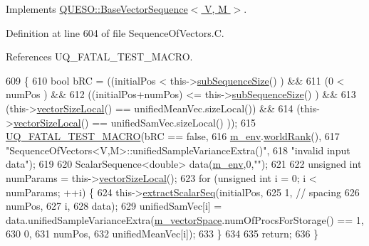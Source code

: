 Implements \hyperlink{class_q_u_e_s_o_1_1_base_vector_sequence_abc759076a4c5d9e1586a6d93629778ff}{Q\-U\-E\-S\-O\-::\-Base\-Vector\-Sequence$<$ V, M $>$}.



Definition at line 604 of file Sequence\-Of\-Vectors.\-C.



References U\-Q\-\_\-\-F\-A\-T\-A\-L\-\_\-\-T\-E\-S\-T\-\_\-\-M\-A\-C\-R\-O.


\begin{DoxyCode}
609 \{
610   \textcolor{keywordtype}{bool} bRC = ((initialPos              <  this->\hyperlink{class_q_u_e_s_o_1_1_sequence_of_vectors_a0224bd3e961d86af5d2886301c0c2b86}{subSequenceSize}()   ) &&
611               (0                       <  numPos                    ) &&
612               ((initialPos+numPos)     <= this->\hyperlink{class_q_u_e_s_o_1_1_sequence_of_vectors_a0224bd3e961d86af5d2886301c0c2b86}{subSequenceSize}()   ) &&
613               (this->\hyperlink{class_q_u_e_s_o_1_1_base_vector_sequence_a2fefedf9e5b90f22881103b3f92555f6}{vectorSizeLocal}() == unifiedMeanVec.sizeLocal()) &&
614               (this->\hyperlink{class_q_u_e_s_o_1_1_base_vector_sequence_a2fefedf9e5b90f22881103b3f92555f6}{vectorSizeLocal}() == unifiedSamVec.sizeLocal() ));
615   \hyperlink{_defines_8h_a56d63d18d0a6d45757de47fcc06f574d}{UQ\_FATAL\_TEST\_MACRO}(bRC == \textcolor{keyword}{false},
616                       \hyperlink{class_q_u_e_s_o_1_1_base_vector_sequence_a8e8824d2a63c5a43bcc6473e3a0491e8}{m\_env}.\hyperlink{class_q_u_e_s_o_1_1_base_environment_a78b57112bbd0e6dd0e8afec00b40ffa7}{worldRank}(),
617                       \textcolor{stringliteral}{"SequenceOfVectors<V,M>::unifiedSampleVarianceExtra()"},
618                       \textcolor{stringliteral}{"invalid input data"});
619 
620   ScalarSequence<double> data(\hyperlink{class_q_u_e_s_o_1_1_base_vector_sequence_a8e8824d2a63c5a43bcc6473e3a0491e8}{m\_env},0,\textcolor{stringliteral}{""});
621 
622   \textcolor{keywordtype}{unsigned} \textcolor{keywordtype}{int} numParams = this->\hyperlink{class_q_u_e_s_o_1_1_base_vector_sequence_a2fefedf9e5b90f22881103b3f92555f6}{vectorSizeLocal}();
623   \textcolor{keywordflow}{for} (\textcolor{keywordtype}{unsigned} \textcolor{keywordtype}{int} i = 0; i < numParams; ++i) \{
624     this->\hyperlink{class_q_u_e_s_o_1_1_sequence_of_vectors_ac977b3b26a6af2ae727671f1246262fd}{extractScalarSeq}(initialPos,
625                            1, \textcolor{comment}{// spacing}
626                            numPos,
627                            i,
628                            data);
629     unifiedSamVec[i] = data.unifiedSampleVarianceExtra(\hyperlink{class_q_u_e_s_o_1_1_base_vector_sequence_a4bd171e39ed050ff105c808336f35198}{m\_vectorSpace}.numOfProcsForStorage() ==
       1,
630                                                        0,
631                                                        numPos,
632                                                        unifiedMeanVec[i]);
633   \}
634 
635   \textcolor{keywordflow}{return};
636 \}
\end{DoxyCode}
